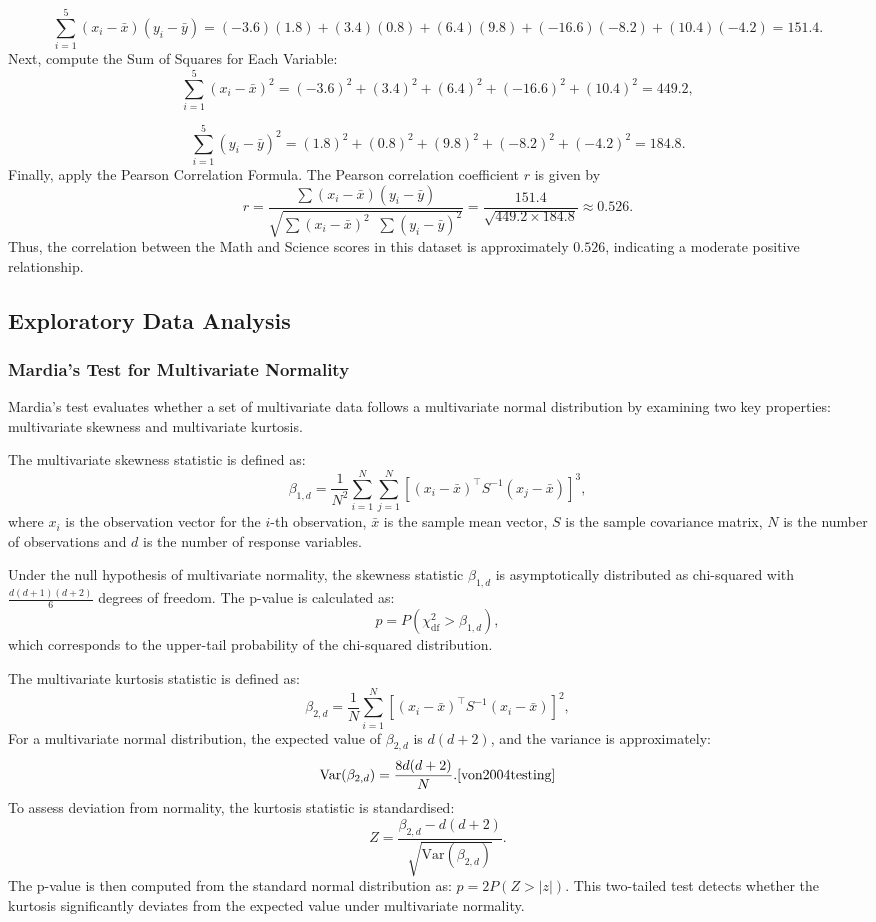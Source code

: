 \documentclass[11pt]{report} %
\begin{document}
\[
\sum_{i=1}^{5} (x_i - \bar{x})(y_i - \bar{y}) 
= (-3.6)(1.8) + (3.4)(0.8) + (6.4)(9.8) + (-16.6)(-8.2) + (10.4)(-4.2)= 151.4.
\]
Next, compute the Sum of Squares for Each Variable:
\[
\sum_{i=1}^{5} (x_i - \bar{x})^2
= (-3.6)^2 + (3.4)^2 + (6.4)^2 + (-16.6)^2 + (10.4)^2 = 449.2,
\]

\[
\sum_{i=1}^{5} (y_i - \bar{y})^2
= (1.8)^2 + (0.8)^2 + (9.8)^2 + (-8.2)^2 + (-4.2)^2 = 184.8.
\]
Finally, apply the Pearson Correlation Formula. The Pearson correlation coefficient \(r\) is given by
\[
r 
= 
\frac{\sum (x_i - \bar{x})(y_i - \bar{y})}
     {\sqrt{\sum (x_i - \bar{x})^2 \;\; \sum (y_i - \bar{y})^2}}
=
\frac{151.4}{\sqrt{449.2 \times 184.8}}
\approx 0.526.
\]
Thus, the correlation between the Math and Science scores in this dataset is approximately \(0.526\), indicating a moderate positive relationship.

\subsection{Exploratory Data Analysis}
\subsubsection{Mardia's Test for Multivariate Normality}
\label{Mardia's Test for MVN}

Mardia's test evaluates whether a set of multivariate data follows a multivariate normal distribution by examining two key properties: {multivariate skewness} and {multivariate kurtosis}.\cite{von2004testing}

The multivariate skewness statistic is defined as:
\[
\beta_{1,d} = \frac{1}{N^2} \sum_{i=1}^{N} \sum_{j=1}^{N} \left[ (x_i - \bar{x})^\top S^{-1} (x_j - \bar{x}) \right]^3,
\]
where \( x_i \) is the observation vector for the \( i \)-th observation, \( \bar{x} \) is the sample mean vector, \( S \) is the sample covariance matrix, \( N \) is the number of observations and \( d \) is the number of response variables.\cite{von2004testing}

Under the null hypothesis of multivariate normality, the skewness statistic \( \beta_{1,d} \) is asymptotically distributed as chi-squared with \( \frac{d(d+1)(d+2)}{6} \) degrees of freedom.\cite{von2004testing}
The p-value is calculated as:
\[
p = P\left( \chi^2_{\text{df}} > \beta_{1,d} \right),
\]
which corresponds to the upper-tail probability of the chi-squared distribution.


The multivariate kurtosis statistic is defined as:
\[
\beta_{2,d} = \frac{1}{N} \sum_{i=1}^{N} \left[ (x_i - \bar{x})^\top S^{-1} (x_i - \bar{x}) \right]^2,
\]
For a multivariate normal distribution, the expected value of \( \beta_{2,d} \) is \( d(d+2) \), and the variance is approximately:
\[
\text{Var}(\beta_{2,d}) = \frac{8d(d+2)}{N}.\cite{von2004testing}
\]
To assess deviation from normality, the kurtosis statistic is standardised:
\[
Z = \frac{\beta_{2,d} - d(d + 2)}{\sqrt{\text{Var}(\beta_{2,d})}}.
\]
The p-value is then computed from the standard normal distribution as:
\(
p = 2P(Z > |z|).
\)
This two-tailed test detects whether the kurtosis significantly deviates from the expected value under multivariate normality.
\end{document}
